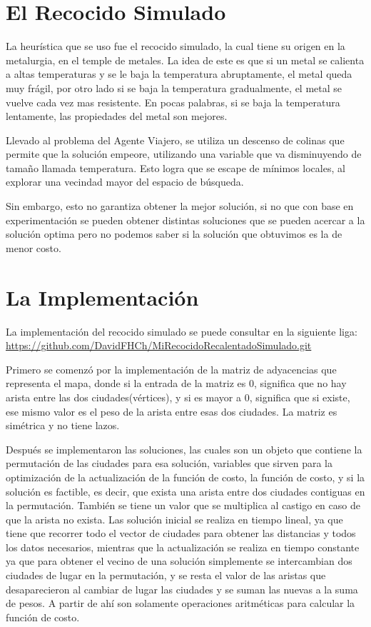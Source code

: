 \documentclass[12pt]{article}
\begin{document}
\section{El Recocido Simulado}

La heurística que se uso fue el recocido simulado, la cual tiene su origen en la metalurgia, en el temple de metales. La idea de este es que si un metal se calienta a altas temperaturas y se le baja la temperatura abruptamente, el metal queda muy frágil, por otro lado si se baja la temperatura gradualmente, el metal se vuelve cada vez mas resistente. En pocas palabras, si se baja la temperatura lentamente, las propiedades del metal son mejores.

Llevado al problema del Agente Viajero, se utiliza un descenso de colinas que permite que la solución empeore, utilizando una variable que va disminuyendo de tamaño llamada temperatura. Esto logra que se escape de mínimos locales, al explorar una vecindad mayor del espacio de búsqueda.

Sin embargo, esto no garantiza obtener la mejor solución, si no que con base en experimentación se pueden obtener distintas soluciones que se pueden acercar a la solución optima pero no podemos saber si la solución que obtuvimos es la de menor costo.

\section{La Implementación}

La implementación del recocido simulado se puede consultar en la siguiente liga: \url{https://github.com/DavidFHCh/MiRecocidoRecalentadoSimulado.git}

Primero se comenzó por la implementación de la matriz de adyacencias que representa el mapa, donde si la entrada de la matriz es 0, significa que no hay arista entre las dos ciudades(vértices), y si es mayor a 0, significa que si existe, ese mismo valor es el peso de la arista entre esas dos ciudades. La matriz es simétrica y no tiene lazos.

Después se implementaron las soluciones, las cuales son un objeto que contiene la permutación de las ciudades para esa solución, variables que sirven para la optimización de la actualización de la función de costo, la función de costo, y si la solución es factible, es decir, que exista una arista entre dos ciudades contiguas en la permutación. También se tiene un valor que se multiplica al castigo en caso de que la arista no exista. Las solución inicial se realiza en tiempo lineal, ya que tiene que recorrer todo el vector de ciudades para obtener las distancias y todos los datos necesarios, mientras que la actualización se realiza en tiempo constante ya que para obtener el vecino de una solución simplemente se intercambian dos ciudades de lugar en la permutación, y se resta el valor de las aristas que desaparecieron al cambiar de lugar las ciudades y se suman las nuevas a la suma de pesos. A partir de ahí son solamente operaciones aritméticas para calcular la función de costo.
\end{document}
